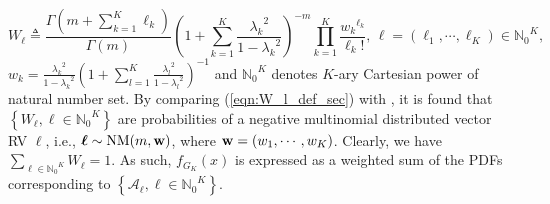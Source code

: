 \documentclass[12pt,onecolumn,draftcls]{IEEEtran}
\newcommand{\bs}{\boldsymbol}
\begin{document}
\begin{equation}\label{eqn:W_l_def_sec}
{W_{\bs{\ell}}} \triangleq \frac{{\Gamma \left( {m + \sum\nolimits_{k = 1}^K {{\ell_k}} } \right)}}{{\Gamma \left( m \right)}}{\left( {1 + \sum\limits_{k = 1}^K {\frac{{{\lambda _k}^2}}{{1 - {\lambda _k}^2}}} } \right)^{ - m}}\prod\limits_{k = 1}^K {\frac{{{w_k}^{{\ell_k}}}}{{{\ell_k}!}}},\, {{\bs{\ell}=(\ell_1,\cdots,\ell_K)} \in {{\mathbb N}_0}^K},
\end{equation}
${w_k} = \frac{{{\lambda _k}^2}}{{1 - {\lambda _k}^2}}{\left( {1 + \sum\nolimits_{l = 1}^K {\frac{{{\lambda _l}^2}}{{1 - {\lambda _l}^2}}} } \right)^{ - 1}}$ and ${{\mathbb N}_0}^K$ denotes $K$-ary Cartesian power of natural number set. %
By comparing (\ref{eqn:W_l_def_sec}) with \cite[Eq.13.8-1]{bishop2007discrete}, it is found that $\left\{{W_{\bs{\ell}}},{{{\bs{\ell}}} \in {{\mathbb N}_0}^K}\right\}$  are probabilities of a negative multinomial distributed vector RV ${\bs{\ell}}$, i.e., ${\bs{\ell}} \sim {\rm NM}(m,\bf w)$, where ${\bf w}=(w_1,\cdots,w_K)$. Clearly, we have $\sum\nolimits_{{\bs{\ell}} \in {{\mathbb N}_0}^K}  {{W_{\bs{\ell}}}}  = 1$. As such, ${f_{ G_K}}\left( x \right)$ is expressed as a weighted sum of the PDFs corresponding to $\left\{\mathcal A_{\bs{\ell}},{{{\bs{\ell}}} \in {{\mathbb N}_0}^K}\right\}$.%
\end{document}
